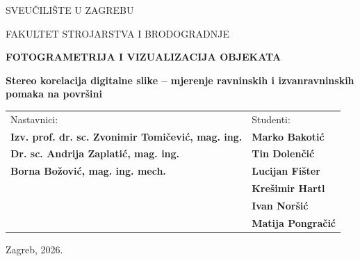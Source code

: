 \documentclass[12pt,a4paper]{article}
\newcommand{\univname}{SVEUČILIŠTE U ZAGREBU}
\newcommand{\facultyname}{FAKULTET STROJARSTVA I BRODOGRADNJE}
\newcommand{\coursename}{FOTOGRAMETRIJA I VIZUALIZACIJA OBJEKATA}
\newcommand{\seminartitle}{Stereo korelacija digitalne slike -- mjerenje ravninskih i izvanravninskih pomaka na površini}
\newcommand{\locationdate}{Zagreb, 2026.}
\begin{document}
\begin{titlepage}
  \centering
  {\fontsize{14}{17}\selectfont \univname \par}
  {\fontsize{14}{17}\selectfont \facultyname \par}
  \vfill
  {\fontsize{24}{30}\bfseries \coursename \par}
  \vspace{0.8cm}
  {\fontsize{14}{18}\bfseries \seminartitle \par}
  \vfill
  \begin{tabular}{p{}>{\raggedleft\arraybackslash}p{}}
    \textmd{Nastavnici:} & \textmd{Studenti:} \\[0.3cm]
    \textbf{Izv. prof. dr. sc. Zvonimir Tomičević, mag. ing.} & \textbf{Marko Bakotić} \\
    \textbf{Dr. sc. Andrija Zaplatić, mag. ing.} & \textbf{Tin Dolenčić} \\
    \textbf{Borna Božović, mag. ing. mech.} & \textbf{Lucijan Fišter} \\
    & \textbf{Krešimir Hartl} \\
    & \textbf{Ivan Noršić} \\
    & \textbf{Matija Pongračić}
  \end{tabular}
  \vspace{1.5cm}
  \par
  {\normalfont \locationdate \par}
\end{titlepage}

\setcounter{page}{1}
\tableofcontents
\clearpage
\listoffigures
\clearpage
\listoftables
\clearpage

\setcounter{page}{1}








\clearpage
{}


\end{document}
